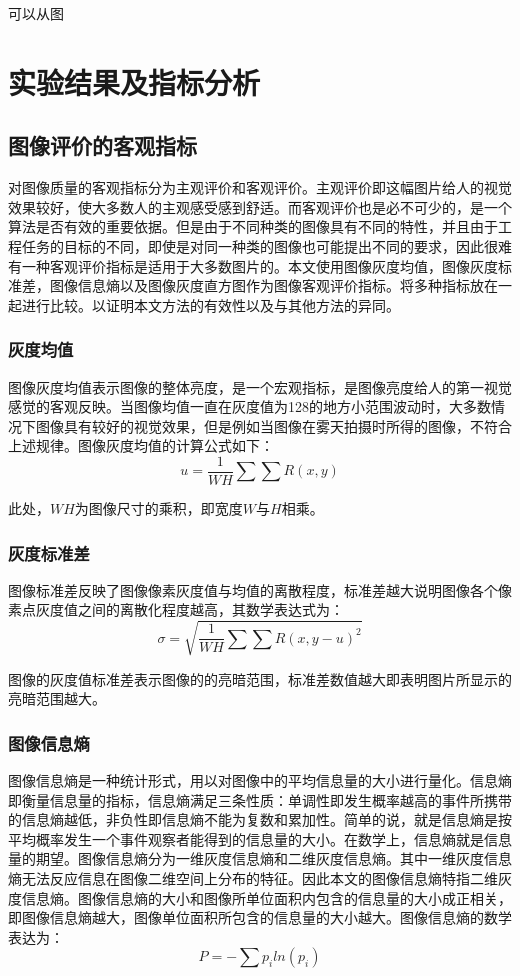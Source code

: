 \documentclass[12pt]{book}
\begin{document}
可以从图






		
	\chapter{实验结果及指标分析}
		\section{图像评价的客观指标}对图像质量的客观指标分为主观评价和客观评价。主观评价即这幅图片给人的视觉效果较好，使大多数人的主观感受感到舒适。而客观评价也是必不可少的，是一个算法是否有效的重要依据。但是由于不同种类的图像具有不同的特性，并且由于工程任务的目标的不同，即使是对同一种类的图像也可能提出不同的要求，因此很难有一种客观评价指标是适用于大多数图片的。本文使用图像灰度均值，图像灰度标准差，图像信息熵以及图像灰度直方图作为图像客观评价指标。将多种指标放在一起进行比较。以证明本文方法的有效性以及与其他方法的异同。
			\subsection{灰度均值}图像灰度均值表示图像的整体亮度，是一个宏观指标，是图像亮度给人的第一视觉感觉的客观反映。当图像均值一直在灰度值为128的地方小范围波动时，大多数情况下图像具有较好的视觉效果，但是例如当图像在雾天拍摄时所得的图像，不符合上述规律。图像灰度均值的计算公式如下：
\begin{equation}	u= \frac{1}{WH} \sum \sum R(x,y) 	\end{equation}	
	
此处，$WH$为图像尺寸的乘积，即宽度$W$与$H$相乘。

			\subsection{灰度标准差}图像标准差反映了图像像素灰度值与均值的离散程度，标准差越大说明图像各个像素点灰度值之间的离散化程度越高，其数学表达式为：
\begin{equation}	 	\sigma =  \sqrt{ \frac{1}{WH} \sum \sum R(x,y-u)^2}	\end{equation}

图像的灰度值标准差表示图像的的亮暗范围，标准差数值越大即表明图片所显示的亮暗范围越大。
			\subsection{图像信息熵}图像信息熵是一种统计形式，用以对图像中的平均信息量的大小进行量化。信息熵即衡量信息量的指标，信息熵满足三条性质：单调性即发生概率越高的事件所携带的信息熵越低，非负性即信息熵不能为复数和累加性。简单的说，就是信息熵是按平均概率发生一个事件观察者能得到的信息量的大小。在数学上，信息熵就是信息量的期望。图像信息熵分为一维灰度信息熵和二维灰度信息熵。其中一维灰度信息熵无法反应信息在图像二维空间上分布的特征。因此本文的图像信息熵特指二维灰度信息熵。图像信息熵的大小和图像所单位面积内包含的信息量的大小成正相关，即图像信息熵越大，图像单位面积所包含的信息量的大小越大。图像信息熵的数学表达为：
\begin{equation}	 	P = - \sum p_iln(p_i)		\end{equation}
\end{document}
